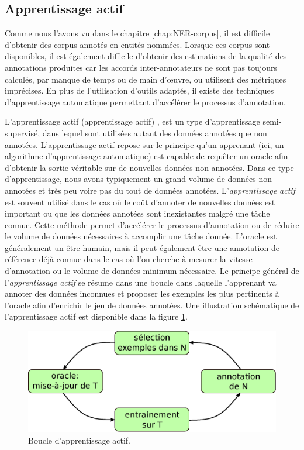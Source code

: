 \documentclass[12pt,a4paper,times,twoside,openright]{report}
\begin{document}
    
    \subsection{Apprentissage actif}
    \label{subsec:perspectives-active-learning}
Comme nous l'avons vu dans le chapitre \ref{chap:NER-corpus}, il est difficile d'obtenir des corpus annotés en entités nommées. Lorsque ces corpus sont disponibles, il est également difficile d'obtenir des estimations de la qualité des annotations produites car les accords inter-annotateurs ne sont pas toujours calculés, par manque de temps ou de main d'\oe uvre, ou utilisent des métriques imprécises. En plus de l'utilisation d'outils adaptés, il existe des techniques d'apprentissage automatique permettant d'accélérer le processus d'annotation.

L'apprentissage actif (apprentissage actif) \citep{angluin1987learning,kinzel1990improving,baum1991neural,mackay1992information}, est un type d'apprentissage semi-supervisé, dans lequel sont utilisées autant des données annotées que non annotées. L'apprentissage actif repose sur le principe qu'un apprenant (ici, un algorithme d'apprentissage automatique) est capable de requêter un oracle afin d'obtenir la sortie véritable sur de nouvelles données non annotées. Dans ce type d'apprentissage, nous avons typiquement un grand volume de données non annotées et très peu voire pas du tout de données annotées. L'\textit{apprentissage actif} est souvent utilisé dans le cas où le coût d'annoter de nouvelles données est important ou que les données annotées sont inexistantes malgré une tâche connue. Cette méthode permet d'accélérer le processus d'annotation ou de réduire le volume de données nécessaires à accomplir une tâche donnée. L'oracle est généralement un être humain, mais il peut également être une annotation de référence déjà connue dans le cas où l'on cherche à mesurer la vitesse d'annotation ou le volume de données minimum nécessaire. Le principe général de l'\textit{apprentissage actif} se résume dans une boucle dans laquelle l'apprenant va annoter des données inconnues et proposer les exemples les plus pertinents à l'oracle afin d'enrichir le jeu de données annotées. Une illustration schématique de l'apprentissage actif est disponible dans la figure \ref{fig:active-learning-loop}.

\begin{figure}[ht!]
\centering
\includegraphics[scale=0.65]{images/active-learning/active-learning-loop}
\caption{Boucle d'apprentissage actif.}
\label{fig:active-learning-loop}
\end{figure}
\end{document}
